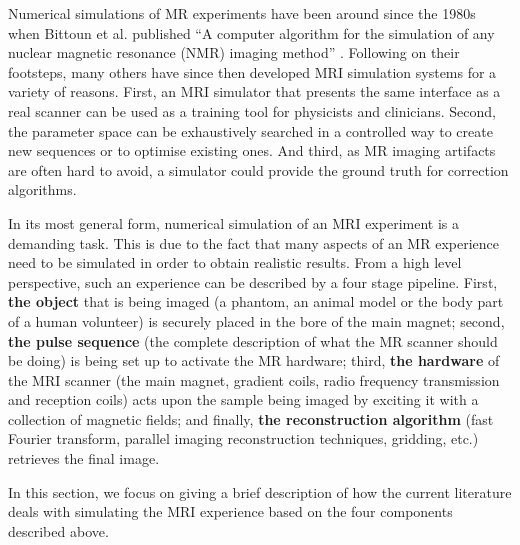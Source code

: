Numerical simulations of MR experiments have been around since the 1980s when Bittoun et al. published ``A computer algorithm for the simulation of any nuclear magnetic resonance (NMR) imaging method'' \cite{Bittoun1984}.
Following on their footsteps, many others have since then developed MRI simulation systems for a variety of reasons.
First, an MRI simulator that presents the same interface as a real scanner can be used as a training tool for physicists and clinicians.
Second, the parameter space can be exhaustively searched in a controlled way to create new sequences or to optimise existing ones.
And third, as MR imaging artifacts are often hard to avoid, a simulator could provide the ground truth for correction algorithms.

\hfill

In its most general form, numerical simulation of an MRI experiment is a demanding task. 
This is due to the fact that many aspects of an MR experience need to be simulated in order to obtain realistic results.
From a high level perspective, such an experience can be described by a four stage pipeline.
First, \textbf{the object} that is being imaged (a phantom, an animal model or the body part of a human volunteer) is securely placed in the bore of the main magnet; second, \textbf{the pulse sequence} (the complete description of what the MR scanner should be doing) is being set up to activate the MR hardware; third, \textbf{the hardware} of the MRI scanner (the main magnet, gradient coils, radio frequency transmission and reception coils) acts upon the sample being imaged by exciting it with a collection of magnetic fields; and finally, \textbf{the reconstruction algorithm} (fast Fourier transform, parallel imaging reconstruction techniques, gridding, etc.) retrieves the final image.

\hfill

In this section, we focus on giving a brief description of how the current literature deals with simulating the MRI experience based on the four components described above.

